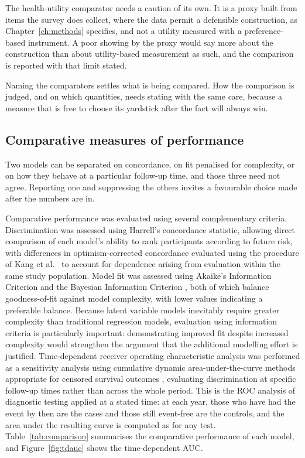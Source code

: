 The health-utility comparator needs a caution of its own. It is a proxy built from items the survey does collect, where the data permit a defensible construction, as Chapter~\ref{ch:methods} specifies, and not a utility measured with a preference-based instrument. A poor showing by the proxy would say more about the construction than about utility-based measurement as such, and the comparison is reported with that limit stated.

Naming the comparators settles what is being compared. How the comparison is judged, and on which quantities, needs stating with the same care, because a measure that is free to choose its yardstick after the fact will always win.

\subsection{Comparative measures of performance}
\label{sec:prog-comparative}

\noindent Two models can be separated on concordance, on fit penalised for complexity, or on how they behave at a particular follow-up time, and those three need not agree. Reporting one and suppressing the others invites a favourable choice made after the numbers are in.

Comparative performance was evaluated using several complementary criteria. Discrimination was assessed using Harrell's concordance statistic, allowing direct comparison of each model's ability to rank participants according to future risk, with differences in optimism-corrected concordance evaluated using the procedure of Kang et al.~\citep{kang_2015} to account for dependence arising from evaluation within the same study population. Model fit was assessed using Akaike's Information Criterion \citep{akaike_1974} and the Bayesian Information Criterion \citep{schwarz_1978}, both of which balance goodness-of-fit against model complexity, with lower values indicating a preferable balance. Because latent variable models inevitably require greater complexity than traditional regression models, evaluation using information criteria is particularly important: demonstrating improved fit despite increased complexity would strengthen the argument that the additional modelling effort is justified. Time-dependent receiver operating characteristic analysis was performed as a sensitivity analysis using cumulative dynamic area-under-the-curve methods appropriate for censored survival outcomes \citep{blanche_2013}, evaluating discrimination at specific follow-up times rather than across the whole period. This is the ROC analysis of diagnostic testing applied at a stated time: at each year, those who have had the event by then are the cases and those still event-free are the controls, and the area under the resulting curve is computed as for any test. Table~\ref{tab:comparison} summarises the comparative performance of each model, and Figure~\ref{fig:tdauc} shows the time-dependent AUC.

